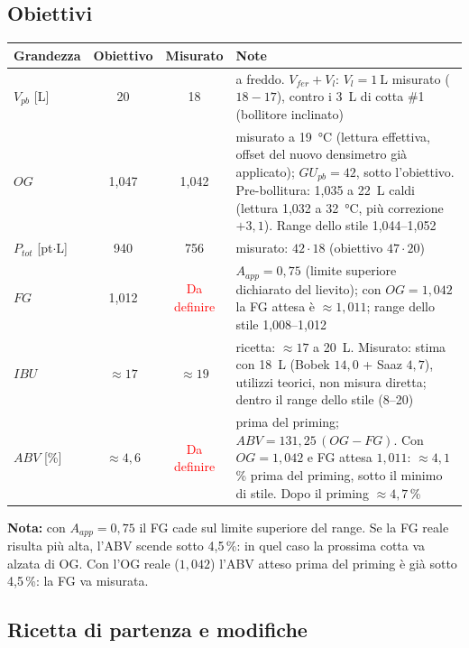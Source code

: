 \subsection*{Obiettivi}
\begin{tabularx}{\linewidth}{@{}lccX@{}}
\toprule
Grandezza & Obiettivo & Misurato & Note \\
\midrule
$V_{pb}$ [\si{\liter}] & 20 & 18 & a freddo. $V_{fer} + V_l$: $V_l = \SI{1}{\liter}$ misurato ($18 - 17$), contro i \SI{3}{\liter} di cotta \#1 (bollitore inclinato) \\
$OG$ & 1,047 & 1,042 & misurato a \SI{19}{\celsius} (lettura effettiva, offset del nuovo densimetro già applicato); $GU_{pb} = 42$, sotto l'obiettivo. Pre-bollitura: 1,035 a \SI{22}{\liter} caldi (lettura 1,032 a \SI{32}{\celsius}, più correzione $+3{,}1$). Range dello stile 1,044--1,052 \\
$P_{tot}$ [pt$\cdot$L] & 940 & 756 & misurato: $42 \cdot 18$ (obiettivo $47 \cdot 20$) \\
$FG$ & 1,012 & \textcolor{red}{Da definire} & $A_{app} = 0{,}75$ (limite superiore dichiarato del lievito); con $OG = 1{,}042$ la FG attesa è $\approx 1{,}011$; range dello stile 1,008--1,012 \\
$IBU$ & $\approx 17$ & $\approx 19$ & ricetta: $\approx 17$ a \SI{20}{\liter}. Misurato: stima con \SI{18}{\liter} (Bobek $14{,}0$ + Saaz $4{,}7$), utilizzi teorici, non misura diretta; dentro il range dello stile (8--20) \\
$ABV$ [\si{\percent}] & $\approx 4{,}6$ & \textcolor{red}{Da definire} & prima del priming; $ABV = 131{,}25\,(OG-FG)$. Con $OG = 1{,}042$ e FG attesa $1{,}011$: $\approx 4{,}1$\,\% prima del priming, sotto il minimo di stile. Dopo il priming $\approx 4{,}7$\,\% \\
\bottomrule
\end{tabularx}

\noindent \textbf{Nota:} con $A_{app} = 0{,}75$ il FG cade sul limite superiore del range. Se la FG reale risulta più alta, l'ABV scende sotto 4,5\,\%: in quel caso la prossima cotta va alzata di OG. Con l'OG reale ($1{,}042$) l'ABV atteso prima del priming è già sotto 4,5\,\%: la FG va misurata.

\subsection*{Ricetta di partenza e modifiche}

